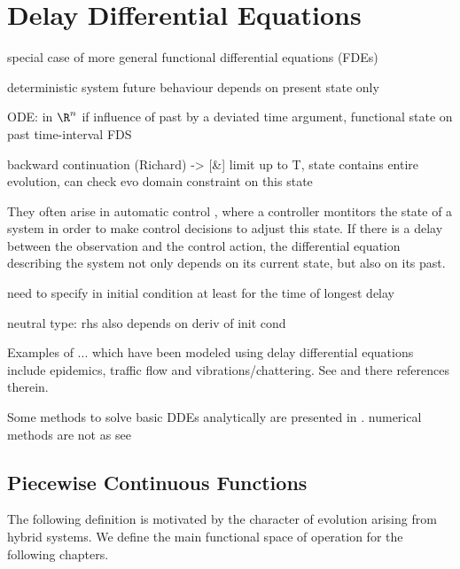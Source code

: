 \chapter{Delay Differential Equations}

special case of more general functional differential equations (FDEs)

deterministic system
future behaviour depends on present state only

ODE: in $\R^n$
if influence of past by a deviated time argument, functional state on past time-interval
FDS



backward continuation (Richard) -> [\&] limit up to T, state contains entire evolution, can check evo domain constraint on this state

They often arise in automatic control %
, where a controller montitors the state of a system in order to make control decisions to adjust this state.
If there is a delay between the observation and the control action, the differential equation describing the system not only depends on its current state, but also on its past.

need to specify in initial condition
at least for the time of longest delay

neutral type: rhs also depends on deriv of init cond



Examples of ... which have been modeled using delay differential equations include epidemics, traffic flow and vibrations/chattering. See \cite{Falbo06FDEs} and there references therein.

Some methods to solve basic DDEs analytically are presented in \cite{Falbo06FDEs}.
numerical methods are not as 
see \cite{Bellen13NumericalDDEs}

\section{Piecewise Continuous Functions}
    \label{sec:piecewise-continuous-functions}
    
    The following definition is motivated by the character of evolution arising from hybrid systems. We define the main functional space of operation for the following chapters.


